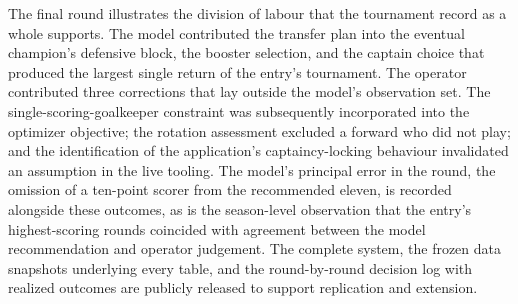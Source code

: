 The final round illustrates the division of labour that the
tournament record as a whole supports. The model contributed the
transfer plan into the eventual champion's defensive block, the
booster selection, and the captain choice that produced the largest
single return of the entry's tournament. The operator contributed
three corrections that lay outside the model's observation set. The
single-scoring-goalkeeper constraint was subsequently incorporated
into the optimizer objective; the rotation assessment excluded a
forward who did not play; and the identification of the
application's captaincy-locking behaviour invalidated an assumption
in the live tooling. The model's principal error in the
round, the omission of a ten-point scorer from the recommended
eleven, is recorded alongside these outcomes, as is the season-level
observation that the entry's highest-scoring rounds coincided with
agreement between the model recommendation and operator judgement.
The complete system, the frozen data snapshots underlying every
table, and the round-by-round decision log with realized outcomes
are publicly released to support replication and extension.
